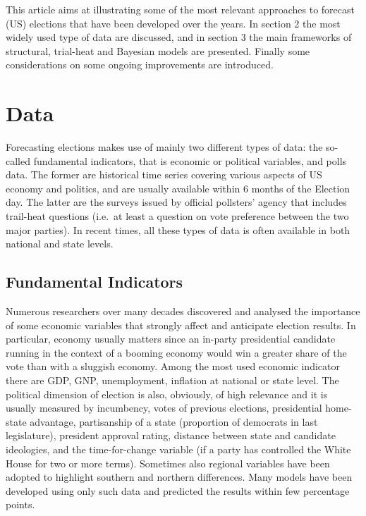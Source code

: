 \documentclass[
  12pt]{article}
\begin{document}
This article aims at illustrating some of the most relevant approaches
to forecast (US) elections that have been developed over the years. In
section 2 the most widely used type of data are discussed, and in
section 3 the main frameworks of structural, trial-heat and Bayesian
models are presented. Finally some considerations on some ongoing
improvements are introduced.

\hypertarget{sec-data}{%
\section{Data}\label{sec-data}}

Forecasting elections makes use of mainly two different types of data:
the so-called fundamental indicators, that is economic or political
variables, and polls data. The former are historical time series
covering various aspects of US economy and politics, and are usually
available within 6 months of the Election day. The latter are the
surveys issued by official pollsters' agency that includes trail-heat
questions (i.e.~at least a question on vote preference between the two
major parties). In recent times, all these types of data is often
available in both national and state levels.

\hypertarget{fundamental-indicators}{%
\subsection{Fundamental Indicators}\label{fundamental-indicators}}

Numerous researchers over many decades discovered and analysed the
importance of some economic variables that strongly affect and
anticipate election results. In particular, economy usually matters
since an in-party presidential candidate running in the context of a
booming economy would win a greater share of the vote than with a
sluggish economy. Among the most used economic indicator there are GDP,
GNP, unemployment, inflation at national or state level. The political
dimension of election is also, obviously, of high relevance and it is
usually measured by incumbency, votes of previous elections,
presidential home-state advantage, partisanship of a state (proportion
of democrats in last legislature), president approval rating, distance
between state and candidate ideologies, and the time-for-change variable
(if a party has controlled the White House for two or more terms).
Sometimes also regional variables have been adopted to highlight
southern and northern differences. Many models have been developed using
only such data and predicted the results within few percentage points.
\end{document}
